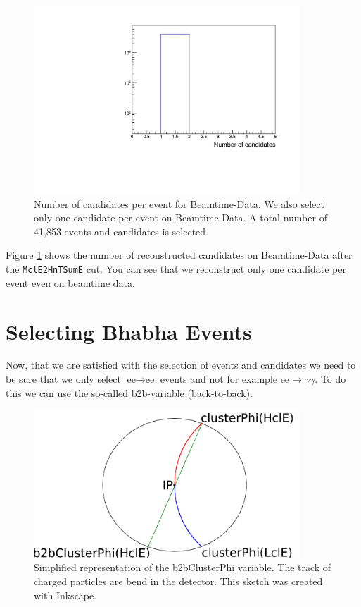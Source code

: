 \documentclass[a4paper,11pt,twosided,final,german,openbib,pdftex,listof=totoc,bibliography=totoc]{scrbook}
\begin{document}
\begin{figure}[h!]
	\centering
	\includegraphics[width=10cm]{Cuts/Data/nCandData.pdf}
	\caption[Number Of Candidates Per Event for Beamtime-Data (All Cuts)]{Number of candidates per event for Beamtime-Data. We also select only one candidate per event on Beamtime-Data. A total number of 41,853 events and candidates is selected.}
	\label{fig:nCandData}
\end{figure}

Figure \ref{fig:nCandData} shows the number of reconstructed candidates on Beamtime-Data after the \texttt{MclE2HnTSumE} cut. You can see that we reconstruct only one candidate per event even on beamtime data.



\section{Selecting Bhabha Events}
\label{sec:SelectingElectronPositron}

Now, that we are satisfied with the selection of events and candidates we need to be sure that we only select $\textrm{ee} \rightarrow \textrm{ee}$ events and not for example $\textrm{ee} \rightarrow \gamma \gamma$. To do this we can use the so-called b2b-variable (back-to-back).

\begin{figure}[h!]
	\centering
	\includegraphics[width=10cm]{Bilder/b2b_2}
	\caption[Sketch Of The b2bClusterPhi Variable]{Simplified representation of the b2bClusterPhi variable. The track of charged particles are bend in the detector. This sketch was created with Inkscape.}
	\label{fig:Sketchb2b}
\end{figure}
\end{document}

